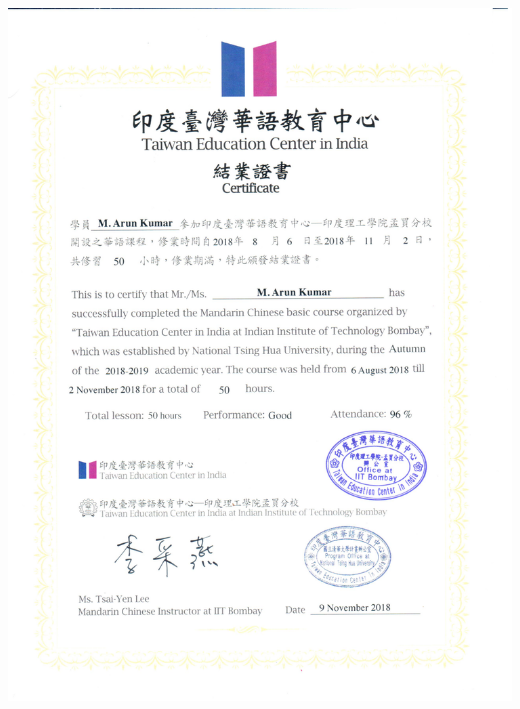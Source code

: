 \documentclass{article}
\begin{document}
		\includegraphics[page=1, scale=0.5]{proofs/chinese_1.pdf}\\
\end{document}
